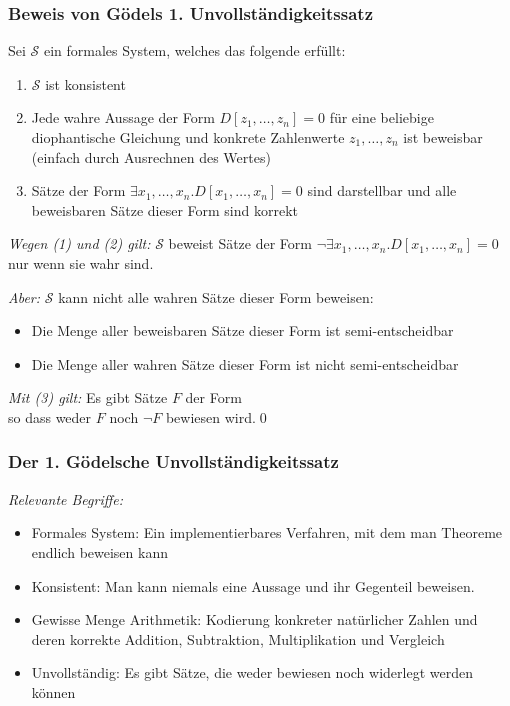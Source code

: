 \documentclass[aspectratio=1610,onlymath]{beamer}
\begin{document}
\begin{frame}\frametitle{Beweis von Gödels 1. Unvollständigkeitssatz}

Sei $\mathcal{S}$ ein formales System, welches das folgende erfüllt:
\begin{enumerate}[(1)]
\item $\mathcal{S}$ ist konsistent
\item Jede wahre Aussage der Form $D[z_1,\ldots,z_n]= 0$ für eine beliebige diophantische Gleichung und \alert{konkrete} Zahlenwerte $z_1,\ldots, z_n$ ist beweisbar\\ {\tiny(einfach durch Ausrechnen des Wertes)}
\item Sätze der Form $\exists x_1,\ldots, x_n.D[x_1,\ldots,x_n]= 0$ sind darstellbar und alle beweisbaren Sätze dieser Form sind korrekt
\end{enumerate}\pause
\emph{Wegen (1) und (2) gilt:} $\mathcal{S}$ beweist Sätze der Form $\neg\exists x_1,\ldots, x_n.D[x_1,\ldots,x_n]= 0$ nur wenn sie wahr sind.\medskip\pause

\emph{Aber:} $\mathcal{S}$ kann nicht alle wahren Sätze dieser Form beweisen:
\begin{itemize}
\item Die Menge aller beweisbaren Sätze dieser Form ist semi-entscheidbar
\item Die Menge aller wahren Sätze dieser Form ist nicht semi-entscheidbar
\end{itemize}\pause
\emph{Mit (3) gilt:} Es gibt Sätze $F$ der Form \\ so dass weder $F$ noch $\neg F$ bewiesen wird.\qed

\end{frame}

\begin{frame}\frametitle{Der 1. Gödelsche Unvollständigkeitssatz}

\bigskip

\emph{Relevante Begriffe:}
\begin{itemize}
\item \alert{Formales System:} Ein implementierbares Verfahren, mit dem man Theoreme endlich beweisen kann
\item \alert{Konsistent:} Man kann niemals eine Aussage und ihr Gegenteil beweisen.
\item \alert{Gewisse Menge Arithmetik:} Kodierung konkreter natürlicher Zahlen und deren korrekte Addition, Subtraktion, Multiplikation und Vergleich
\item \alert{Unvollständig:} Es gibt Sätze, die weder bewiesen noch widerlegt werden können
\end{itemize}

\end{frame}
\end{document}
